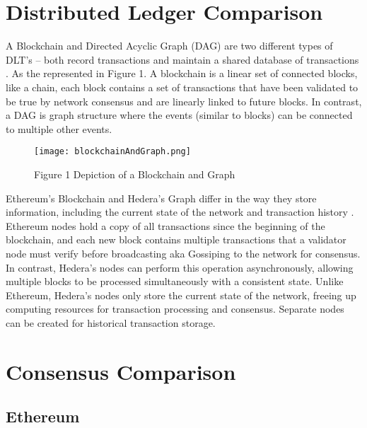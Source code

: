 \documentclass[
	a4paper, %
	10pt, %
	unnumberedsections, %
	twoside, %
]{LTJournalArticle}
\begin{document}
\section{Distributed Ledger Comparison}

A Blockchain and Directed Acyclic Graph (DAG) are two different types of DLT’s – both record transactions and maintain a shared database of transactions \cite{lashkari_comprehensive_2021}.
As the represented in Figure 1. A blockchain is a linear set of connected blocks, like a chain, each block contains a set of transactions that have been validated to be true by network consensus and are linearly linked to future blocks. In contrast, a DAG is graph structure where the events (similar to blocks) can be connected to multiple other events.
\begin{figure}[h]
\texttt{[image: blockchainAndGraph.png]}
\caption{Figure 1 Depiction of a Blockchain and Graph}
\end{figure}

Ethereum’s Blockchain and Hedera’s Graph differ in the way they store information, including the current state of the network and transaction history \cite{b_anupama_analysis_2022}. Ethereum nodes hold a copy of all transactions since the beginning of the blockchain, and each new block contains multiple transactions that a validator node must verify before broadcasting aka Gossiping to the network for consensus. In contrast, Hedera's nodes can perform this operation asynchronously, allowing multiple blocks to be processed simultaneously with a consistent state. Unlike Ethereum, Hedera's nodes only store the current state of the network, freeing up computing resources for transaction processing and consensus. Separate nodes can be created for historical transaction storage.

\section{Consensus Comparison}

\subsection{Ethereum}
\end{document}

